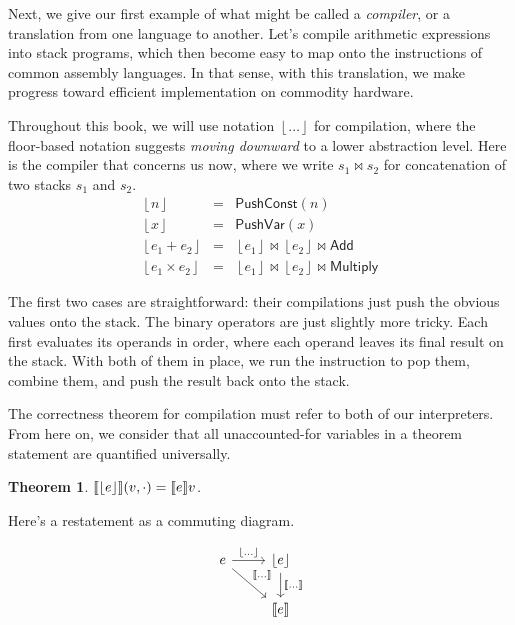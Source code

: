 \documentclass{amsbook}
\newtheorem{theorem}{Theorem}[chapter]
\theoremstyle{definition}
\theoremstyle{remark}
\numberwithin{section}{chapter}
\numberwithin{equation}{chapter}
\begin{document}
Next, we give our first example of what might be called a \emph{compiler}, or a translation from one language to another.
Let's compile arithmetic expressions into stack programs, which then become easy to map onto the instructions of common assembly languages.
In that sense, with this translation, we make progress toward efficient implementation on commodity hardware.

\newcommand{\compile}[1]{{\left \lfloor #1 \right \rfloor}}
\newcommand{\concat}[2]{#1 \bowtie #2}

Throughout this book, we will use notation $\compile{\ldots}$ for compilation, where the floor-based notation suggests \emph{moving downward} to a lower abstraction level.
Here is the compiler that concerns us now, where we write $\concat{s_1}{s_2}$ for concatenation of two stacks $s_1$ and $s_2$.
\encoding
\begin{eqnarray*}
  \compile{n} &=& \mathsf{PushConst}(n) \\
  \compile{x} &=& \mathsf{PushVar}(x) \\
  \compile{e_1 + e_2} &=& \concat{\compile{e_1}}{\concat{\compile{e_2}}{\mathsf{Add}}} \\
  \compile{e_1 \times e_2} &=& \concat{\compile{e_1}}{\concat{\compile{e_2}}{\mathsf{Multiply}}}
\end{eqnarray*}

The first two cases are straightforward: their compilations just push the obvious values onto the stack.
The binary operators are just slightly more tricky.
Each first evaluates its operands in order, where each operand leaves its final result on the stack.
With both of them in place, we run the instruction to pop them, combine them, and push the result back onto the stack.

The correctness theorem for compilation must refer to both of our interpreters.
From here on, we consider that all unaccounted-for variables in a theorem statement are quantified universally.

\begin{theorem}
  $\denote{\compile{e}}(v, \cdot) = \denote{e}v$.
\end{theorem}

Here's a restatement as a commuting diagram.

\[
\begin{tikzcd}
e \arrow{r}{\compile{\ldots}} \arrow{dr}{\denote{\ldots}} & \compile{e} \arrow{d}{\denote{\ldots}} \\
& \denote{e}
\end{tikzcd}
\]
\end{document}

